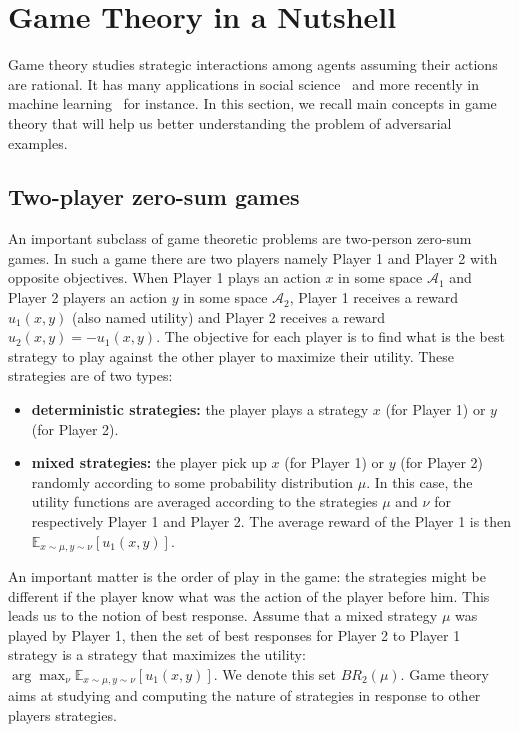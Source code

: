 \section{Game Theory in a Nutshell}

Game theory studies strategic interactions among agents assuming their actions are rational. It has many applications in social science~\citep{moulin1986game} and more recently in machine learning~\citep{goodfellow2014generative} for instance. In this section, we recall main concepts in game theory that will help us better understanding the problem of adversarial examples. 


\subsection{Two-player zero-sum games}

An important subclass of game theoretic problems are two-person zero-sum games.  In such a game there are two players namely Player 1 and Player 2 with opposite objectives. When Player 1 plays an action $x$ in some space $\mathcal{A}_1$ and Player 2 players an action $y$ in some space $\mathcal{A}_2$, Player 1 receives a reward $u_1(x,y)$ (also named utility) and Player 2 receives a reward $u_2(x,y)= -u_1(x,y)$. The objective for each player is to find what is the best strategy to play against the other player to maximize their utility. These strategies are of two types:
\begin{itemize}
    \item \textbf{deterministic strategies:} the player plays a strategy $x$ (for Player 1) or $y$ (for Player 2). 
    \item \textbf{mixed strategies:} the player pick up $x$ (for Player 1) or $y$ (for Player 2) randomly according to some probability distribution $\mu$. In this case, the utility functions are averaged according to the strategies $\mu$ and $\nu$ for respectively Player 1 and Player 2.  The average reward of the Player 1 is then $\mathbb{E}_{x\sim\mu,y\sim\nu}\left[u_1(x,y)\right]$.
\end{itemize}

An important matter is the order of play in the game: the strategies might be different if the player know what was the action of the player before him. This leads us to the notion of best response. Assume that a mixed strategy $\mu$ was played by Player 1, then the set of best responses for Player 2 to Player 1 strategy is a strategy that maximizes the utility: $\arg\max_{\nu}\mathbb{E}_{x\sim\mu,y\sim\nu}\left[u_1(x,y)\right]$. We denote this set $BR_2(\mu)$. Game theory aims at studying and computing the nature of strategies in response to other players strategies.

